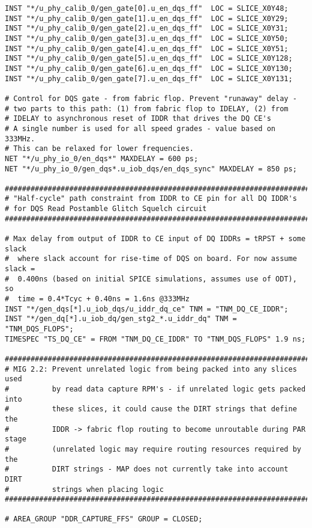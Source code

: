 \begin{verbatim}
INST "*/u_phy_calib_0/gen_gate[0].u_en_dqs_ff"  LOC = SLICE_X0Y48;
INST "*/u_phy_calib_0/gen_gate[1].u_en_dqs_ff"  LOC = SLICE_X0Y29;
INST "*/u_phy_calib_0/gen_gate[2].u_en_dqs_ff"  LOC = SLICE_X0Y31;
INST "*/u_phy_calib_0/gen_gate[3].u_en_dqs_ff"  LOC = SLICE_X0Y50;
INST "*/u_phy_calib_0/gen_gate[4].u_en_dqs_ff"  LOC = SLICE_X0Y51;
INST "*/u_phy_calib_0/gen_gate[5].u_en_dqs_ff"  LOC = SLICE_X0Y128;
INST "*/u_phy_calib_0/gen_gate[6].u_en_dqs_ff"  LOC = SLICE_X0Y130;
INST "*/u_phy_calib_0/gen_gate[7].u_en_dqs_ff"  LOC = SLICE_X0Y131;

# Control for DQS gate - from fabric flop. Prevent "runaway" delay -
# two parts to this path: (1) from fabric flop to IDELAY, (2) from
# IDELAY to asynchronous reset of IDDR that drives the DQ CE's
# A single number is used for all speed grades - value based on 333MHz.
# This can be relaxed for lower frequencies.
NET "*/u_phy_io_0/en_dqs*" MAXDELAY = 600 ps;
NET "*/u_phy_io_0/gen_dqs*.u_iob_dqs/en_dqs_sync" MAXDELAY = 850 ps;

###############################################################################
# "Half-cycle" path constraint from IDDR to CE pin for all DQ IDDR's
# for DQS Read Postamble Glitch Squelch circuit
###############################################################################

# Max delay from output of IDDR to CE input of DQ IDDRs = tRPST + some slack
#  where slack account for rise-time of DQS on board. For now assume slack = 
#  0.400ns (based on initial SPICE simulations, assumes use of ODT), so 
#  time = 0.4*Tcyc + 0.40ns = 1.6ns @333MHz
INST "*/gen_dqs[*].u_iob_dqs/u_iddr_dq_ce" TNM = "TNM_DQ_CE_IDDR";
INST "*/gen_dq[*].u_iob_dq/gen_stg2_*.u_iddr_dq" TNM = "TNM_DQS_FLOPS";
TIMESPEC "TS_DQ_CE" = FROM "TNM_DQ_CE_IDDR" TO "TNM_DQS_FLOPS" 1.9 ns;

###############################################################################
# MIG 2.2: Prevent unrelated logic from being packed into any slices used
#          by read data capture RPM's - if unrelated logic gets packed into
#          these slices, it could cause the DIRT strings that define the
#          IDDR -> fabric flop routing to become unroutable during PAR stage
#          (unrelated logic may require routing resources required by the
#          DIRT strings - MAP does not currently take into account DIRT
#          strings when placing logic
###############################################################################
 
# AREA_GROUP "DDR_CAPTURE_FFS" GROUP = CLOSED;


\end{verbatim}
